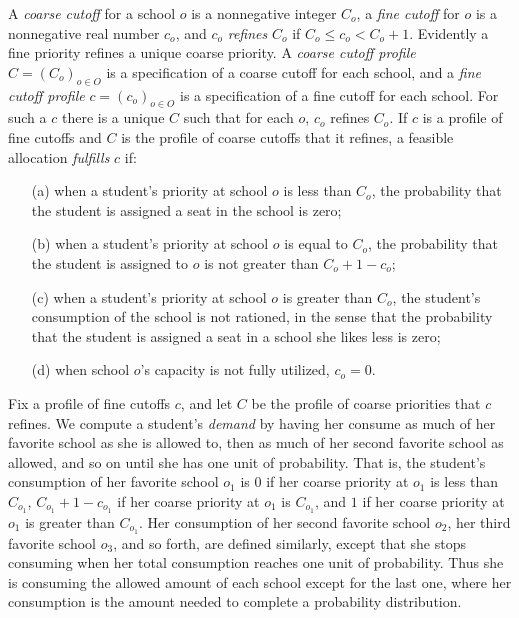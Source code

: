 \documentclass[12pt]{article}
\theoremstyle{definition}
\begin{document}
A \emph{coarse cutoff} for a school $o$ is a nonnegative integer
$C_o$, a \emph{fine cutoff} for $o$ is a nonnegative real number
$c_o$, and $c_o$ \emph{refines} $C_o$ if $C_o \le c_o < C_o + 1$.
Evidently a fine priority refines a unique coarse priority.  A
\emph{coarse cutoff profile} $C = (C_o)_{o \in O}$ is a specification
of a coarse cutoff for each school, and a \emph{fine cutoff profile}
$c = (c_o)_{o \in O}$ is a specification of a fine cutoff for each
school.  For such a $c$ there is a unique $C$ such that for each $o$,
$c_o$ refines $C_o$.  If $c$ is a profile of fine cutoffs and $C$ is
the profile of coarse cutoffs that it refines, a feasible allocation
\emph{fulfills} $c$ if:
\begin{enumerate}
  \item[(a)] when a student's priority at school $o$ is less than
    $C_o$, the probability that the student is assigned a seat in the
    school is zero;
  \item[(b)] when a student's priority at school $o$ is equal to
    $C_o$, the probability that the student is assigned to $o$ is not
    greater than $C_o + 1 - c_o$;
  \item[(c)] when a student's priority at school $o$ is greater than
    $C_o$, the student's consumption of the school is not rationed, in
    the sense that the probability that the student is assigned a seat
    in a school she likes less is zero;
  \item[(d)] when school $o$'s capacity is not fully utilized, $c_o = 0$.
\end{enumerate}

Fix a profile of fine cutoffs $c$, and let $C$ be the profile of
coarse priorities that $c$ refines.  We compute a student's
\emph{demand} by having her consume as much of her favorite school as
she is allowed to, then as much of her second favorite school as
allowed, and so on until she has one unit of probability.  That is,
the student's consumption of her favorite school $o_1$ is $0$ if her
coarse priority at $o_1$ is less than $C_{o_1}$, $C_{o_1} + 1 -
c_{o_1}$ if her coarse priority at $o_1$ is $C_{o_1}$, and $1$ if her
coarse priority at $o_1$ is greater than $C_{o_1}$.  Her consumption
of her second favorite school $o_2$, her third favorite school $o_3$,
and so forth, are defined similarly, except that she stops consuming
when her total consumption reaches one unit of probability.  Thus she
is consuming the allowed amount of each school except for the last
one, where her consumption is the amount needed to complete a
probability distribution.
\end{document}
